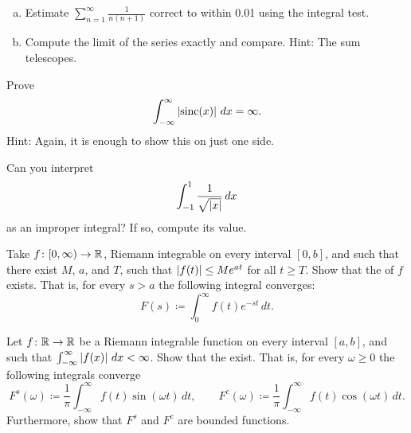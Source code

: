 \begin{exercise}
\leavevmode
\begin{enumerate}[a)]
\item
Estimate $\sum_{n=1}^\infty \frac{1}{n(n+1)}$ correct to within 0.01
using the integral test.
\item
Compute the limit of the series exactly
and compare.  Hint: The sum telescopes.
\end{enumerate}
\end{exercise}

\begin{exercise}
Prove 
\begin{equation*}
\int_{-\infty}^\infty \left\lvert {\operatorname{sinc}(x)} \right\rvert\,dx = \infty .
\end{equation*}
Hint: Again, it is enough to show this on just one side.
\end{exercise}

\begin{exercise}
Can you interpret
\begin{equation*}
\int_{-1}^1 \frac{1}{\sqrt{\left\lvert {x} \right\rvert}}\,dx
\end{equation*}
as an improper integral?  If so, compute its value.
\end{exercise}

\begin{exercise}
Take $f \colon [0,\infty) \to {\mathbb{R}}$, Riemann integrable on
every interval $[0,b]$, and such that there exist $M$, $a$, and $T$,
such that $\left\lvert {f(t)} \right\rvert \leq M e^{at}$ for all $t \geq T$.  Show that the
\emph{} of $f$ exists.  That is, for
every $s > a$ the following integral converges:
\begin{equation*}
F(s) \coloneqq \int_{0}^\infty f(t) e^{-st} \,dt .
\end{equation*}
\end{exercise}

\begin{exercise}
Let $f \colon {\mathbb{R}} \to {\mathbb{R}}$ be a Riemann integrable function
on every interval $[a,b]$, and such
that $\int_{-\infty}^\infty \left\lvert {f(x)} \right\rvert\,dx < \infty$.  Show that the
\emph{}
exist.  That is, for every $\omega \geq 0$ the
following integrals converge
\begin{equation*}
F^s(\omega) \coloneqq \frac{1}{\pi} \int_{-\infty}^\infty f(t) \sin(\omega t) \,dt ,
\qquad
F^c(\omega) \coloneqq \frac{1}{\pi} \int_{-\infty}^\infty f(t) \cos(\omega t) \,dt .
\end{equation*}
Furthermore, show that $F^s$ and $F^c$ are bounded functions.
\end{exercise}

